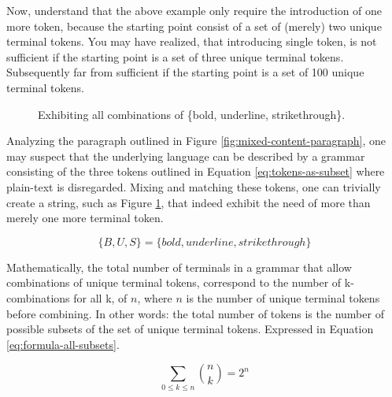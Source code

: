 \documentclass{scrreprt}
\begin{document}
Now, understand that the above example only require the introduction of one more token, because the starting point consist of a set of (merely) two unique terminal tokens. You may have realized, that introducing single token, is not sufficient if the starting point is a set of three unique terminal tokens. Subsequently far from sufficient if the starting point is a set of 100 unique terminal tokens.


\begin{figure}[h]
\centering
{}
\caption{Exhibiting all combinations of \{bold, underline, strikethrough\}.}
\label{fig:mixed-content-paragraph-complex}
\end{figure}


Analyzing the paragraph outlined in Figure \ref{fig:mixed-content-paragraph}, one may suspect that the underlying language can be described by a grammar consisting of the three tokens outlined in Equation \ref{eq:tokens-as-subset} where plain-text is disregarded. Mixing and matching these tokens, one can trivially create a string, such as Figure \ref{fig:mixed-content-paragraph-complex}, that indeed exhibit the need of more than merely one more terminal token.



\begin{equation}
\{B, U, S\} = \{bold, underline, strikethrough\}
\label{eq:tokens-as-subset}
\end{equation}



Mathematically, the total number of terminals in a grammar that allow combinations of unique terminal tokens, correspond to the number of k-combinations for all k, of \(n\), where \(n\) is the number of unique terminal tokens before combining. In other words: the total number of tokens is the number of possible subsets of the set of unique terminal tokens. Expressed in Equation \ref{eq:formula-all-subsets}.

\begin{equation}
\sum_{0\leq{k}\leq{n}} {n \choose k} = 2^n
\label{eq:formula-all-subsets}
\end{equation}
\end{document}
